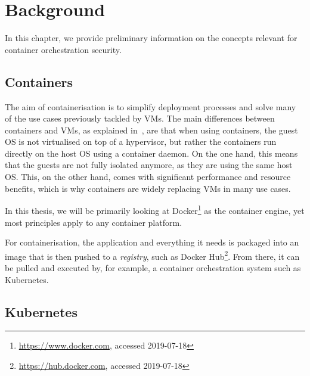 
\chapter{Background} \label{cha:background}

In this chapter, we provide preliminary information on the concepts relevant for container orchestration security.

\section{Containers}

The aim of containerisation is to simplify deployment processes and solve many of the use cases previously tackled by \acp{VM}. The main differences between containers and \acp{VM}, as explained in~\textcite{containersVsVMs}, are that when using containers, the guest OS is not virtualised on top of a hypervisor, but rather the containers run directly on the host OS using a container daemon. On the one hand, this means that the guests are not fully isolated anymore, as they are using the same host OS. This, on the other hand, comes with significant performance and resource benefits, which is why containers are widely replacing \acp{VM} in many use cases.

In this thesis, we will be primarily looking at Docker\footnote{\url{https://www.docker.com}, accessed 2019-07-18} as the container engine, yet most principles apply to any container platform.

For containerisation, the application and everything it needs is packaged into an image that is then pushed to a \textit{registry}, such as Docker Hub\footnote{\url{https://hub.docker.com}, accessed 2019-07-18}. From there, it can be pulled and executed by, for example, a container orchestration system such as Kubernetes. 

\section{Kubernetes}


